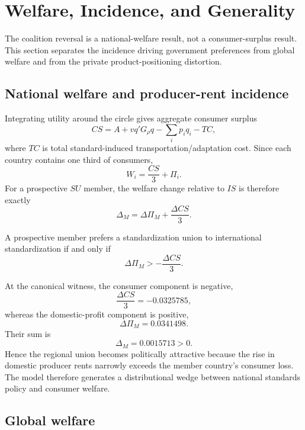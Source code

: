 \section{Welfare, Incidence, and Generality}\label{sec:welfare}

The coalition reversal is a national-welfare result, not a consumer-surplus result. This section separates the incidence driving government preferences from global welfare and from the private product-positioning distortion.

\subsection{National welfare and producer-rent incidence}

Integrating utility around the circle gives aggregate consumer surplus
\begin{equation}\label{eq:cs-identity}
CS=A+vq'G_\rho q-\sum_i p_iq_i-TC,
\end{equation}
where $TC$ is total standard-induced transportation/adaptation cost. Since each country contains one third of consumers,
\[
W_i=\frac{CS}{3}+\Pi_i.
\]
For a prospective $SU$ member, the welfare change relative to $IS$ is therefore exactly
\begin{equation}\label{eq:member-decomposition}
\Delta_M=\Delta\Pi_M+\frac{\Delta CS}{3}.
\end{equation}

\begin{proposition}\label{prop:member-threshold}
A prospective member prefers a standardization union to international standardization if and only if
\begin{equation}\label{eq:member-threshold}
\Delta\Pi_M>-\frac{\Delta CS}{3}.
\end{equation}
\end{proposition}

At the canonical witness, the consumer component is negative,
\[
\frac{\Delta CS}{3}=-0.0325785,
\]
whereas the domestic-profit component is positive,
\[
\Delta\Pi_M=0.0341498.
\]
Their sum is
\[
\Delta_M=0.0015713>0.
\]
Hence the regional union becomes politically attractive because the rise in domestic producer rents narrowly exceeds the member country's consumer loss. The model therefore generates a distributional wedge between national standards policy and consumer welfare.

\subsection{Global welfare}

